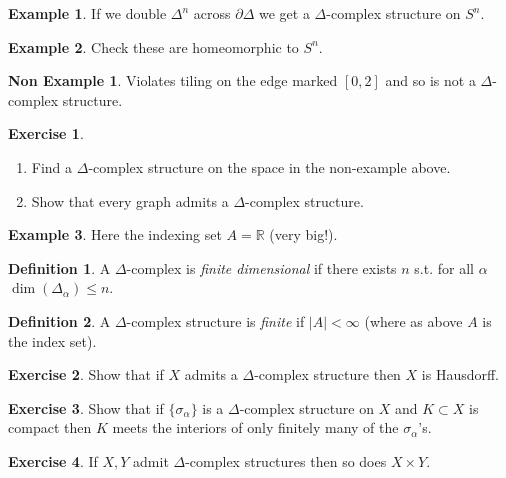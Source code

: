 \documentclass{article}
\theoremstyle{definition}
\newtheorem*{defn}{Definition}
\newtheorem*{ex}{Example}
\newtheorem*{nex}{Non Example}
\newtheorem*{exer}{Exercise}
\newcommand{\RR}{\mathbb{R}}
\begin{document}
\begin{ex}
If we double $\Delta^n$ across $\partial \Delta$ we get a $\Delta$-complex structure on $S^n$.
\end{ex}

\begin{ex}
Check these are homeomorphic to $S^n$.
\end{ex}

\begin{nex}
Violates tiling on the edge marked $[0,2]$ and so is not a $\Delta$-complex structure.
\end{nex}

\begin{exer}
\begin{enumerate}
\item Find a $\Delta$-complex structure on the space in the non-example above.
\item Show that every graph admits a $\Delta$-complex structure.
\end{enumerate}
\end{exer}

\begin{ex}
Here the indexing set $A = \RR$ (very big!).
\end{ex}

\begin{defn}
A $\Delta$-complex is \emph{finite dimensional} if there exists $n$ s.t. for all $\alpha$ $\dim(\Delta_\alpha) \le n$.
\end{defn}

\begin{defn}
A $\Delta$-complex structure is \emph{finite} if $|A| < \infty$ (where as above $A$ is the index set).
\end{defn}

\begin{exer}
Show that if $X$ admits a $\Delta$-complex structure then $X$ is Hausdorff.
\end{exer}

\begin{exer}
Show that if $\{\sigma_\alpha\}$ is a $\Delta$-complex structure on $X$ and $K\subset X$ is compact then $K$ meets the interiors of only finitely many of the $\sigma_\alpha$'s.
\end{exer}

\begin{exer}
If $X,Y$ admit $\Delta$-complex structures then so does $X\times Y$.
\end{exer}
\end{document}
